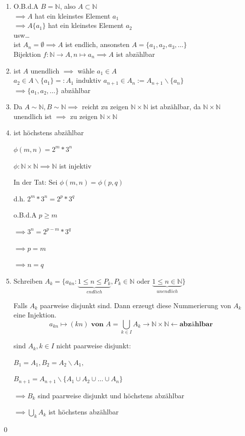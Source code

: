 \documentclass[fleqn]{scrartcl}
\renewenvironment{proof}{{\bfseries Beweis }}{\qed}
\begin{document}
\begin{proof}
\begin{enumerate}[1)]
\item O.B.d.A $B = \mathbb{N}$, also $A \subset \mathbb{N}$\\$\implies A$ hat ein kleinstes Element $a_1$\\$\implies A \{a_1\}$ hat ein kleinstes Element $a_2$\\usw\ldots\\ist $A_n = \emptyset \implies A$ ist endlich, ansonsten $A = \{a_1, a_2, a_3, \ldots\}$\\Bijektion $f:\mathbb{N}\rightarrow A, n\mapsto a_n \implies A$ ist abzählbar
\item ist $A$ unendlich $\implies$ wähle $a_1 \in A$\\
	$a_2 \in A \backslash \{a_1\} =: A_1$
	induktiv $a_{n+1} \in A_n := A_{n+1} \backslash \{a_n\}$\\
	$\implies \{a_1, a_2, \ldots\}$ abzählbar
	
\item Da $A \sim \mathbb{N}, B \sim \mathbb{N} \implies$ reicht zu zeigen $\mathbb{N} \times \mathbb{N}$ ist abzählbar, da $\mathbb{N} \times \mathbb{N}$ unendlich ist $\implies$ zu zeigen $\mathbb{N} \times \mathbb{N}$
\item ist höchstens abzählbar

	$\phi (m,n) = 2^m * 3^n$
	
	$\phi : \mathbb{N} \times \mathbb{N} \implies \mathbb{N}$ ist injektiv
	
	In der Tat: Sei $\phi (m,n) = \phi (p,q)$
	
	d.h. $2^m * 3^n = 2^p * 3^q$
	
	o.B.d.A $p \geq m$
	
	$\implies 3^n = 2^{p-m} * 3^q$
	
	$\implies p = m$
	
	$\implies n = q$
	
\item Schreiben $A_k = \{a_{kn} :\underbrace{1\leq n \leq P_k}_{endlich}, P_k \in \mathbb{N}$ oder $\underbrace{1 \leq n \in \mathbb{N}}_{unendlich}\}$

	Falls $A_k$ paarweise disjunkt sind. Dann erzeugt diese Nummerierung von $A_k$ eine Injektion.
	\[a_{kn} \mapsto (kn) \textbf{ von } A = \bigcup_{k \in I} A_k \rightarrow \mathbb{N} \times \mathbb{N} \leftarrow \textbf{abzählbar}\]
	
	sind $A_k, k \in I$ nicht paarweise disjunkt:
	
	$B_1 = A_1, B_2 = A_2 \backslash A_1,$
	
	$B_{n+1} = A_{n+1} \backslash \{A_1 \cup A_2 \cup \ldots \cup A_n\}$
	
	$\implies B_k$ sind paarweise disjunkt und höchstens abzählbar
	
	$\implies \bigcup_{k} A_k$ ist höchstens abzählbar
\end{enumerate}
\end{proof}
\end{document}
